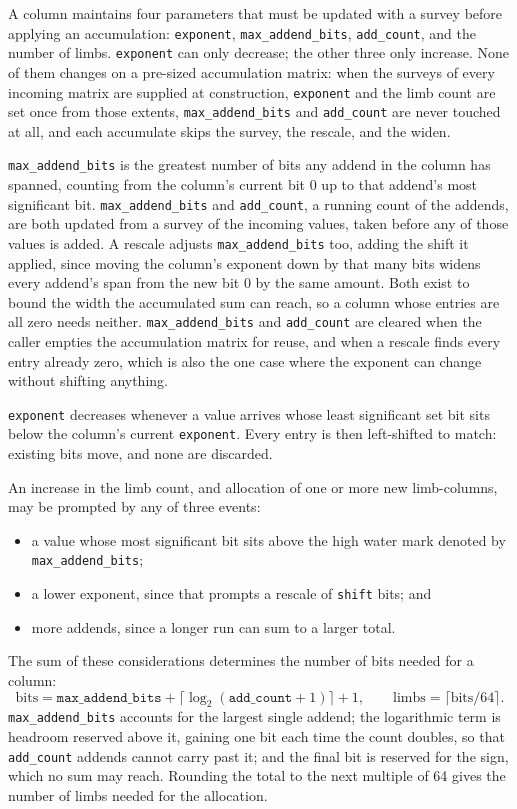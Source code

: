 \documentclass[acmsmall,screen,review]{acmart}
\newcommand{\code}[1]{\texttt{#1}}
\begin{document}
A column maintains four parameters that must be updated with a survey before applying an accumulation: \code{exponent}, \code{max\_addend\_bits}, \code{add\_count}, and the number of limbs. \code{exponent} can only decrease; the other three only increase. None of them changes on a pre-sized accumulation matrix: when the surveys of every incoming matrix are supplied at construction, \code{exponent} and the limb count are set once from those extents, \code{max\_addend\_bits} and \code{add\_count} are never touched at all, and each accumulate skips the survey, the rescale, and the widen.

\code{max\_addend\_bits} is the greatest number of bits any addend in the column has spanned, counting from the column's current bit 0 up to that addend's most significant bit. \code{max\_addend\_bits} and \code{add\_count}, a running count of the addends, are both updated from a survey of the incoming values, taken before any of those values is added. A rescale adjusts \code{max\_addend\_bits} too, adding the shift it applied, since moving the column's exponent down by that many bits widens every addend's span from the new bit 0 by the same amount. Both exist to bound the width the accumulated sum can reach, so a column whose entries are all zero needs neither. \code{max\_addend\_bits} and \code{add\_count} are cleared when the caller empties the accumulation matrix for reuse, and when a rescale finds every entry already zero, which is also the one case where the exponent can change without shifting anything.

\code{exponent} decreases whenever a value arrives whose least significant set bit sits below the column's current \code{exponent}. Every entry is then left-shifted to match: existing bits move, and none are discarded.

An increase in the limb count, and allocation of one or more new limb-columns, may be prompted by any of three events:
\begin{itemize}
\item a value whose most significant bit sits above the high water mark denoted by \code{max\_addend\_bits};
\item a lower exponent, since that prompts a rescale of \code{shift} bits; and
\item more addends, since a longer run can sum to a larger total.
\end{itemize}

The sum of these considerations determines the number of bits needed for a column:
\begin{equation}
\text{bits} = \code{max\_addend\_bits} + \lceil \log_2(\code{add\_count} + 1) \rceil + 1, \qquad
\text{limbs} = \lceil \text{bits} / 64 \rceil .
\label{eq:width}
\end{equation}
\code{max\_addend\_bits} accounts for the largest single addend; the logarithmic term is headroom reserved above it, gaining one bit each time the count doubles, so that \code{add\_count} addends cannot carry past it; and the final bit is reserved for the sign, which no sum may reach. Rounding the total to the next multiple of 64 gives the number of limbs needed for the allocation.
\end{document}
